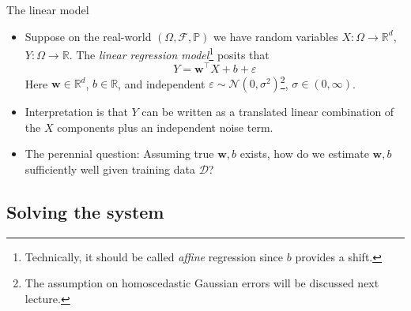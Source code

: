 \documentclass{beamer}
\numberwithin{equation}{section}
\begin{document}
\begin{frame}{The linear model}
    \begin{itemize}
        \item
        Suppose on the real-world $ (\Omega, \mathcal{F}, \mathbb{P}) $ we
        have random variables $ X : \Omega \rightarrow \mathbb{R}^d $,
        $ Y : \Omega \rightarrow \mathbb{R} $. The \textit{linear regression
        model}\footnote{
            Technically, it should be called \textit{affine} regression since
            $ b $ provides a shift.
        } posits that
        \begin{equation} \label{lr_model}
            Y = \mathbf{w}^\top X + b + \varepsilon
        \end{equation}
        Here $ \mathbf{w} \in \mathbb{R}^d $, $ b \in \mathbb{R} $, and
        independent $ \varepsilon \sim \mathcal{N}(0, \sigma^2) $\footnote{
            The assumption on homoscedastic Gaussian errors will be discussed
            next lecture.
        }, $ \sigma \in (0, \infty) $.

        \item
        Interpretation is that $ Y $ can be written as a translated linear
        combination of the $ X $ components plus an independent noise term.

        \item
        The perennial question: Assuming true $ \mathbf{w}, b $ exists, how do
        we estimate $ \mathbf{w}, b $ sufficiently well given training data
        $ \mathcal{D} $?
    \end{itemize}
\end{frame}

\subsection{Solving the system}
\end{document}

